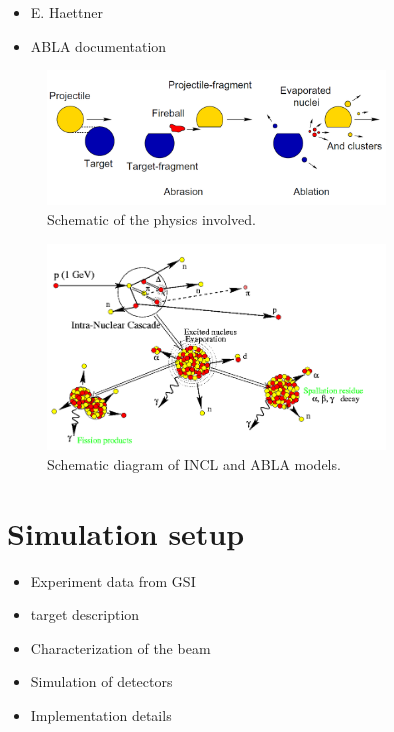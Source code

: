 \begin{itemize}
 \item E. Haettner
 \item ABLA documentation
\end{itemize}
\begin{figure}
\begin{center}
\includegraphics[width=0.8\textwidth]{images/ablationabration.png}  
\caption{Schematic of the physics involved.}
 \label{fig:ablationabration}
 \end{center}
 \end{figure}
\begin{figure} 
\begin{center}
\includegraphics[width=0.8\textwidth]{images/inclScematic.png}  
\caption{\label{fig:inclschematic} Schematic diagram of INCL and ABLA models.}
 
 \end{center}
 \end{figure}


\section{Simulation setup}
\begin{itemize}
\item Experiment data from GSI
\item target description
\item Characterization of the beam
\item Simulation of detectors
\item Implementation details
\end{itemize}

